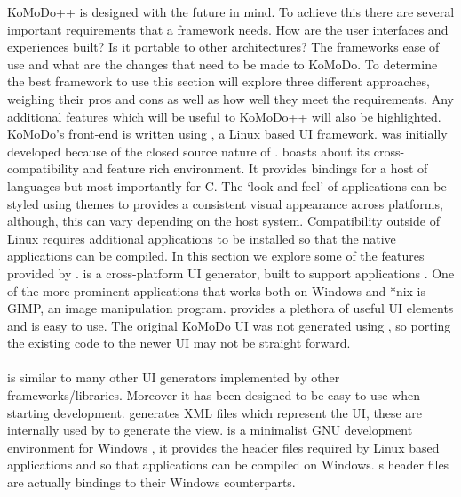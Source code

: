 \graphicspath{ {images/research/} }
%
KoMoDo++ is designed with the future in mind. To achieve this there are several important requirements that a framework needs. How are the user interfaces and experiences built? Is it portable to other architectures? The frameworks ease of use and what are the changes that need to be made to KoMoDo. To determine the best framework to use this section will explore three different approaches, weighing their pros and cons as well as how well they meet the requirements. Any additional features which will be useful to KoMoDo++ will also be highlighted.
%
KoMoDo's front-end is written using , a Linux based UI framework.  was initially developed because of the closed source nature of .  boasts about its cross-compatibility and feature rich environment\cite{gtk}. It provides bindings for a host of languages but most importantly for C. The  `look and feel' of  applications can be styled using themes to provides a consistent visual appearance across platforms, although, this can vary depending on the host system. Compatibility outside of Linux requires additional applications to be installed so that the native  applications can be compiled. In this section we explore some of the features provided by .
   is a cross-platform UI generator, built to support  applications \cite{glade}. One of the more prominent applications that works both on Windows and *nix is GIMP, an image manipulation program.  provides a plethora of useful UI elements and is easy to use. The original KoMoDo UI was not generated using , so porting the existing code to the newer UI may not be straight forward.\\\\
   is similar to many other UI generators implemented by other frameworks/libraries. Moreover it has been designed to be easy to use when starting development.  generates XML files which represent the UI, these are internally used by  to generate the view.
   is a minimalist GNU development environment for Windows \cite{mingw}, it provides the header files required by Linux based applications and  so that applications can be compiled on Windows. s header files are actually bindings to their Windows counterparts.\\\\
